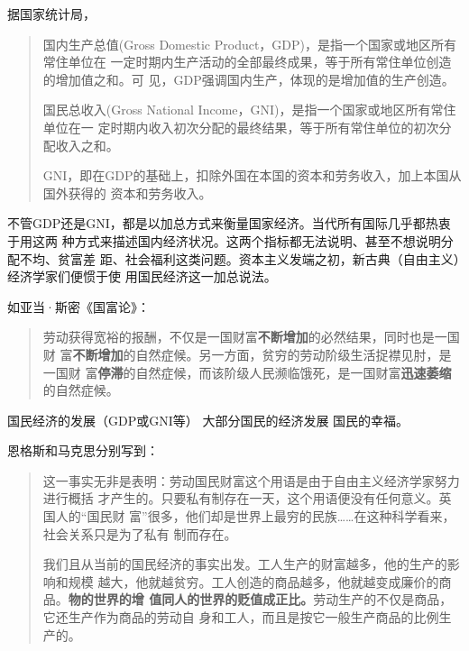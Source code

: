 据国家统计局，

\begin{quotation}
  国内生产总值(Gross Domestic Product，GDP)，是指一个国家或地区所有常住单位在
  一定时期内生产活动的全部最终成果，等于所有常住单位创造的增加值之和。可
  见，GDP强调国内生产，体现的是增加值的生产创造。


  国民总收入(Gross National Income，GNI)，是指一个国家或地区所有常住单位在一
  定时期内收入初次分配的最终结果，等于所有常住单位的初次分配收入之和。

  GNI，即在GDP的基础上，扣除外国在本国的资本和劳务收入，加上本国从国外获得的
  资本和劳务收入。
\end{quotation}

不管GDP还是GNI，都是以加总方式来衡量国家经济。当代所有国际几乎都热衷于用这两
种方式来描述国内经济状况。这两个指标都无法说明、甚至不想说明分配不均、贫富差
距、社会福利这类问题。资本主义发端之初，新古典（自由主义）经济学家们便惯于使
用国民经济这一加总说法。

如亚当·斯密《国富论》：
\begin{quotation}
  劳动获得宽裕的报酬，不仅是一国财富\textbf{不断增加}的必然结果，同时也是一国财
  富\textbf{不断增加}的自然症候。另一方面，贫穷的劳动阶级生活捉襟见肘，是一国财
  富\textbf{停滞}的自然症候，而该阶级人民濒临饿死，是一国财富\textbf{迅速萎缩}的自然症候。
\end{quotation}


国民经济的发展（GDP或GNI等） \neq 大部分国民的经济发展 \neq 国民的幸福。

恩格斯和马克思分别写到：
\begin{quotation}
  这一事实无非是表明：劳动国民财富这个用语是由于自由主义经济学家努力进行概括
  才产生的。只要私有制存在一天，这个用语便没有任何意义。英国人的“国民财
  富”很多，他们却是世界上最穷的民族……在这种科学看来，社会关系只是为了私有
  制而存在。


  我们且从当前的国民经济的事实出发。工人生产的财富越多，他的生产的影响和规模
  越大，他就越贫穷。工人创造的商品越多，他就越变成廉价的商品。\textbf{物的世界的增
    值同人的世界的贬值成正比。}劳动生产的不仅是商品，它还生产作为商品的劳动自
  身和工人，而且是按它一般生产商品的比例生产的。
\end{quotation}

